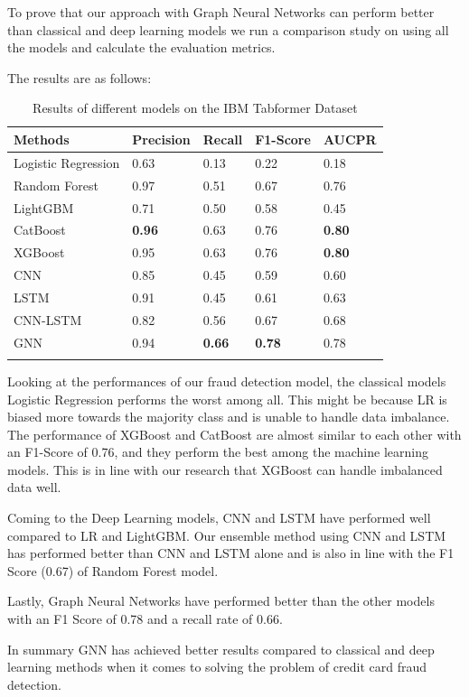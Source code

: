 \documentclass[pdflatex,sn-mathphys-num]{sn-jnl}%
\begin{document}
To prove that our approach with Graph Neural Networks can perform better than classical and deep learning models we run a comparison study on using all the models and calculate the evaluation metrics.

The results are as follows:

\begin{table}[h]
\caption{Results of different models on the IBM Tabformer Dataset}\label{tab1}%
\begin{tabular}{@{}lllll@{}}
\toprule
Methods & Precision  & Recall & F1-Score & AUCPR\\
\midrule
Logistic Regression    & 0.63   & 0.13  & 0.22 & 0.18  \\
Random Forest    & 0.97   & 0.51  & 0.67 & 0.76  \\
LightGBM  & 0.71   & 0.50  & 0.58 & 0.45  \\
CatBoost    & \textbf{0.96}   & 0.63  & 0.76 & \textbf{0.80}  \\
XGBoost    & 0.95   & 0.63  & 0.76 & \textbf{0.80}   \\
CNN    & 0.85   & 0.45  & 0.59 & 0.60   \\
LSTM    & 0.91   & 0.45  & 0.61 & 0.63   \\
CNN-LSTM    & 0.82   & 0.56  & 0.67 & 0.68   \\
GNN    & 0.94   & \textbf{0.66}  & \textbf{0.78} & 0.78   \\
\botrule
\end{tabular}
\end{table}

Looking at the performances of our fraud detection model, the classical models Logistic Regression performs the worst among all. This might be because LR is biased more towards the majority class and is unable to handle data imbalance. The performance of XGBoost and CatBoost are almost similar to each other with an F1-Score of 0.76, and they perform the best among the machine learning models. This is in line with our research that XGBoost can handle imbalanced data well.

Coming to the Deep Learning models, CNN and LSTM have performed well compared to LR and LightGBM. Our ensemble method using CNN and LSTM has performed better than CNN and LSTM alone and is also in line with the F1 Score (0.67) of Random Forest model.

Lastly, Graph Neural Networks have performed better than the other models with an F1 Score of 0.78 and a recall rate of 0.66.

In summary GNN has achieved better results compared to classical and deep learning methods when it comes to solving the problem of credit card fraud detection.
\end{document}
